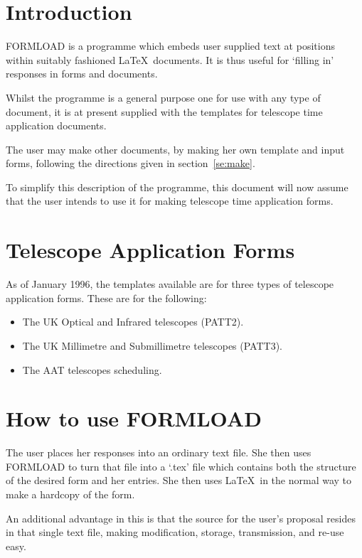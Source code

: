 \newpage
\section{Introduction}

FORMLOAD is a programme which embeds user supplied text at positions
within suitably fashioned \LaTeX\ documents. It is thus useful for `filling
in' responses in forms and documents.

Whilst the programme is a general purpose one for use with any type of
document, it is at present supplied with the templates for telescope time
application documents. 

The user may make other documents, by making her own template and input
forms, following the directions given in section~\ref{se:make}. 

To simplify this description of the programme, this document will now
assume that the user intends to use it for making telescope time
application forms. 

\section{Telescope Application Forms}

As of January 1996, the templates available are for three types of telescope
application forms. These are for the following:

\begin{itemize}

\item The UK Optical and Infrared telescopes (PATT2).
\item The UK Millimetre and Submillimetre telescopes (PATT3).
\item The AAT telescopes scheduling.

\end{itemize}

\section{How to use FORMLOAD }
\label{se:use}

The user places her responses into an ordinary text file. She then uses
FORMLOAD to turn that file into a `.tex' file which contains both the
structure of the desired form and her entries. She then uses \LaTeX\ in the
normal way to make a hardcopy of the form. 

An additional advantage in this is that the source for the user's proposal
resides in that single text file, making modification, storage,
transmission, and re-use easy. 

